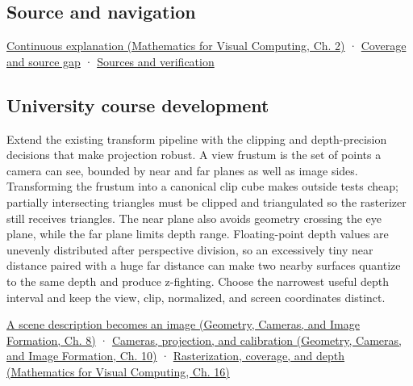 \subsection{Source and navigation}\label{appendix-1c07d64f5e70-source-and-navigation}

\href{../02-Mathematics-for-Visual-Computing/main.pdf\#nameddest=01-foundations-i-ch018-keep-the-promises-visible-while-moving-between-representations}{Continuous explanation (Mathematics for Visual Computing, Ch. 2)} · \hyperref[appendix-fd090d982a15-phase-7---parts-601-700]{Coverage and source gap} · \hyperref[appendix-a103e7846d21-phase-7---source-analysis-and-verification]{Sources and verification}

\subsection{University course development}\label{appendix-1c07d64f5e70-university-course-development}

Extend the existing transform pipeline with the clipping and depth-precision decisions that make projection robust. A view frustum is the set of points a camera can see, bounded by near and far planes as well as image sides. Transforming the frustum into a canonical clip cube makes outside tests cheap; partially intersecting triangles must be clipped and triangulated so the rasterizer still receives triangles. The near plane also avoids geometry crossing the eye plane, while the far plane limits depth range. Floating-point depth values are unevenly distributed after perspective division, so an excessively tiny near distance paired with a huge far distance can make two nearby surfaces quantize to the same depth and produce z-fighting. Choose the narrowest useful depth interval and keep the view, clip, normalized, and screen coordinates distinct.

\href{../03-Geometry-Cameras-and-Image-Formation/main.pdf\#nameddest=03-visual-computing-i-ch001-a-scene-description-becomes-an-image}{A scene description becomes an image (Geometry, Cameras, and Image Formation, Ch. 8)} · \href{../03-Geometry-Cameras-and-Image-Formation/main.pdf\#nameddest=03-visual-computing-i-ch003-cameras-projection-and-calibration}{Cameras, projection, and calibration (Geometry, Cameras, and Image Formation, Ch. 10)} · \href{../02-Mathematics-for-Visual-Computing/main.pdf\#nameddest=03-visual-computing-i-ch012-rasterization-coverage-and-depth}{Rasterization, coverage, and depth (Mathematics for Visual Computing, Ch. 16)}

